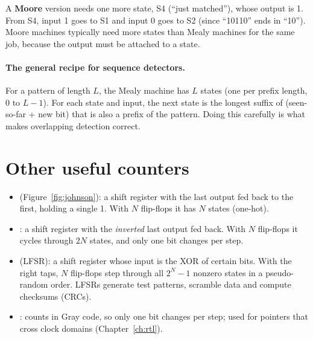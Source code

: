 A \textbf{Moore} version needs one more state, S4 (``just matched''), whose output is 1. From S4, input 1 goes to S1 and input 0 goes to S2 (since ``10110'' ends in ``10''). Moore machines typically need more states than Mealy machines for the same job, because the output must be attached to a state.

\paragraph{The general recipe for sequence detectors.} For a pattern of length $L$, the Mealy machine has $L$ states (one per prefix length, $0$ to $L-1$). For each state and input, the next state is the longest suffix of (seen-so-far + new bit) that is also a prefix of the pattern. Doing this carefully is what makes overlapping detection correct.

\section{Other useful counters}

\begin{itemize}
  \item {} (Figure~\ref{fig:johnson}): a shift register with the last output fed back to the first, holding a single 1. With $N$ flip-flops it has $N$ states (one-hot).
  \item {}: a shift register with the \emph{inverted} last output fed back. With $N$ flip-flops it cycles through $2N$ states, and only one bit changes per step.
  \item {} (LFSR): a shift register whose input is the XOR of certain bits. With the right taps, $N$ flip-flops step through all $2^N - 1$ nonzero states in a pseudo-random order. LFSRs generate test patterns, scramble data and compute checksums (CRCs).
  \item {}: counts in Gray code, so only one bit changes per step; used for pointers that cross clock domains (Chapter~\ref{ch:rtl}).
\end{itemize}

